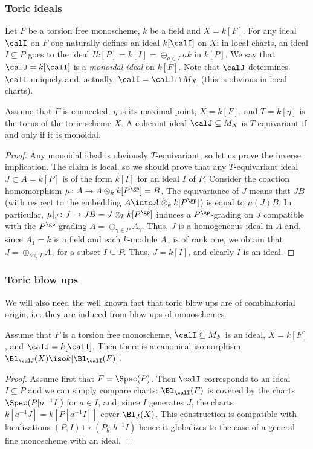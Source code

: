 \documentclass[10pt]{../fichiers-configuration-latex/smfart}
\begin{document}
\subsubsection{Toric ideals}\label{8-toricidealsec} Let $F$ be
a torsion free monoscheme, $k$ be a field and $X=k[F]$. For any
ideal $\calI$ on $F$ one naturally defines an ideal $k[\calI]$
on $X$: in local charts, an ideal $I\subseteq P$ goes to the
ideal $Ik[P]=k[I]=\oplus_{a\in I}ak$ in $k[P]$. We say that
$\calJ=k[\calI]$ is a {\em monoidal ideal} on $k[F]$. Note that
$\calJ$ determines $\calI$ uniquely and, actually, $\calI=\calJ\cap
M_X$ (this is obvious in local charts).

\begin{lemma2}\label{8-toricideallem} Assume that $F$ is connected,
$\eta$ is its maximal point, $X=k[F]$, and $T=k[\eta]$ is the torus
of the toric scheme $X$. A coherent ideal $\calJ\subseteq{M}_X$
is $T$-equivariant if and only if it is monoidal.  \end{lemma2}
\begin{proof} Any monoidal ideal is obviously $T$-equivariant,
so let us prove the inverse implication. The claim is local, so
we should prove that any $T$-equivariant ideal $J\subset A=k[P]$
is of the form $k[I]$ for an ideal $I$ of $P$. Consider the
coaction homomorphism $\mu{\colon}A\to A\otimes_k k[P^\gp]=B$. The
equivariance of $J$ means that $JB$ (with respect to the embedding
$A\into A\otimes_k k[P^\gp]$) is equal to $\mu(J)B$. In particular,
$\mu|_J{\colon}J\to JB=J\otimes_k k[P^\gp]$ induces a $P^\gp$-grading
on $J$ compatible with the $P^\gp$-grading $A=\oplus_{\gamma\in P}
A_\gamma$. Thus, $J$ is a homogeneous ideal in $A$ and, since $A_1=k$
is a field and each $k$-module $A_\gamma$ is of rank one, we obtain
that $J=\oplus_{\gamma\in I} A_\gamma$ for a subset $I\subseteq
P$. Thus, $J=k[I]$, and clearly $I$ is an ideal.  \end{proof}

\subsubsection{Toric blow ups}\label{8-toricblowsec} We will also
need the well known fact that toric blow ups are of combinatorial
origin, i.e. they are induced from blow ups of monoschemes.

\begin{lemma2}\label{8-blowfanlem} Assume that $F$ is a torsion
free monoscheme, $\calI\subseteq{M}_F$ is an ideal, $X=k[F]$,
and $\calJ=k[\calI]$. Then there is a canonical isomorphism
$\Bl_\calJ(X)\iso k[\Bl_\calI(F)]$.  \end{lemma2} \begin{proof}
Assume first that $F=\Spec(P)$. Then $\calI$ corresponds to an ideal
$I\subseteq P$ and we can simply compare charts: $\Bl_\calI(F)$
is covered by the charts $\Spec(P[a^{-1}I])$ for $a\in I$, and,
since $I$ generates $J$, the charts $k[a^{-1}J]=k[P[a^{-1}I]]$
cover $\Bl_J(X)$. This construction is compatible with localizations
$(P,I)\mapsto (P_b,b^{-1}I)$ hence it globalizes to the case of a
general fine monoscheme with an ideal.  \end{proof}
\end{document}
